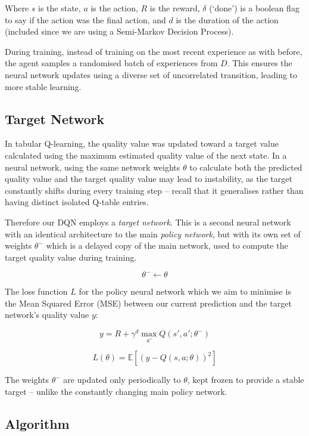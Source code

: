 \documentclass[a4paper]{report}
\begin{document}
Where $s$ is the state, $a$ is the action, $R$ is the reward, $\delta$ (`done') is a boolean flag to say if the action was the final action, and $d$ is the duration of the action (included since we are using a Semi-Markov Decision Process).

During training, instead of training on the most recent experience as with before, the agent samples a randomised batch of experiences from $D$. This ensures the neural network updates using a diverse set of uncorrelated transition, leading to more stable learning.

\subsection{Target Network}

In tabular Q-learning, the quality value was updated toward a target value calculated using the maximum estimated quality value of the next state. In a neural network, using the same network weights $\theta$ to calculate both the predicted quality value and the target quality value may lead to instability, as the target constantly shifts during every training step -- recall that it generalises rather than having distinct isolated Q-table entries.

Therefore our DQN employs a \emph{target network}. This is a second neural network with an identical architecture to the main \emph{policy network}, but with its own set of weights $\theta^-$ which is a delayed copy of the main network, used to compute the target quality value during training.

$$\theta^- \leftarrow \theta$$

The loss function $L$ for the policy neural network which we aim to minimise is the Mean Squared Error (MSE) between our current prediction and the target network's quality value $y$:

$$y=R + \gamma^d \max_{a'} Q(s', a'; \theta^-)$$

$$L(\theta) = \mathbb{E}\left[\left(y - Q(s, a; \theta)\right)^2\right]$$

The weights $\theta^-$ are updated only periodically to $\theta$, kept frozen to provide a stable target -- unlike the constantly changing main policy network.

\subsection{Algorithm}
\end{document}
